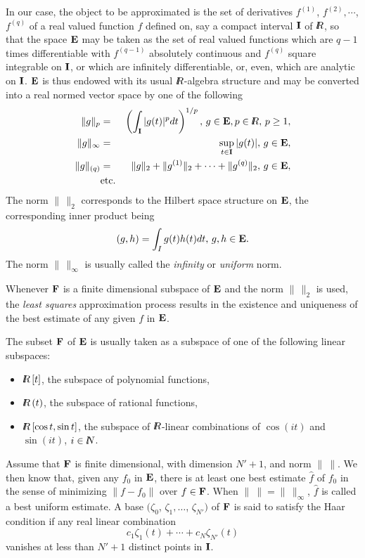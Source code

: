 In our case, the object to be approximated is the set of derivatives $f^{(1)}$,
$f^{(2)}, \cdots$, $f^{(q)}$ of a real valued function $f$ defined
on, say a compact interval ${\bf I}$ of $\hbox{$l\! \! R$}$, so that the space ${\bf E}$
may be taken as the set of real valued functions which are $q-1$ times
differentiable with $f^{(q-1)}$ absolutely continuous and $f^{(q)}$ square
integrable on ${\bf I}$, or which are infinitely differentiable, or, even, which
are analytic on ${\bf I}$.
${\bf E}$ is thus endowed with its usual $\hbox{$l\! \! R$}$-algebra
structure and may be converted into a real normed vector space by one of
the following 
\begin{eqnarray*}
\| g \|_p & = & \left( \int_{\bf I} |g(t)|^pdt \right)^{1/p}, \, g \in {\bf E}, p
\in \hbox{$l\! \! R$}, \, p \ge 1, \\
\| g \|_\infty & = &\sup_{t \in {\bf I}} |g(t)|, \, g \in {\bf E}, \\
\| g \|_{(q)} & = &\| g \|_2 + \| g^{(1)} \|_2 + \cdots +
\| g^{(q)}\|_2, \, g \in {\bf E}, \\
& \hbox{\rm etc.} &
\end{eqnarray*}
The norm $\| \, \|_2$ corresponds to the Hilbert space
structure on ${\bf E}$, the corresponding inner product being
$$
\left( g, h \right) = \int_I g(t)h(t)dt, \, g, h \in {\bf E}.
$$
The norm $\| \, \|_\infty$ is usually called the {\it infinity} or {\it
uniform} norm.

Whenever ${\bf F}$ is a finite dimensional subspace of
${\bf E}$ and the norm
$\| \, \|_2$ is used,
 the {\it least squares} approximation process results in the existence and 
uniqueness of the best
estimate of any given $f$ in ${\bf E}$.

The subset ${\bf F}$ of ${\bf E}$ is usually taken as a subspace of one of
the following linear subspaces:
\begin{itemize}
\item
$\hbox{$l\! \! R$}\left[ t \right]$, the subspace of polynomial functions,
\item
$\hbox{$l\! \! R$}\left( t \right)$, the subspace of rational functions,
\item
$\hbox{$l\! \! R$}\left[ \cos t, \sin t \right]$, the subspace of $\hbox{$l\! \! R$}$-linear
combinations of $\cos(it)$ and $\sin(it)$, $i \in \hbox{$l\! \! N$}$.
\end{itemize}
Assume that ${\bf F}$ is finite dimensional, with dimension $N'+1$, and norm $\| \ \|$.
We then know that, given any $f_0$ in ${\bf E}$, there is at least one
best estimate $\hat f$ of $f_0$ in the sense of minimizing $\| f-f_0 \|$ over
$f \in {\bf F}$.  When  $\| \ \| = \| \, \|_\infty$, $\hat f$ is called a best uniform
estimate.
A base $(\zeta_0$, $\zeta_1, \ldots$, $\zeta_{N'})$ of ${\bf F}$ is said to
satisfy the Haar condition if any real linear combination
$$
c_1\zeta_1(t) + \cdots + c_N\zeta_{N'}(t)
$$
vanishes at less than $N'+1$ distinct points in ${\bf I}$.

